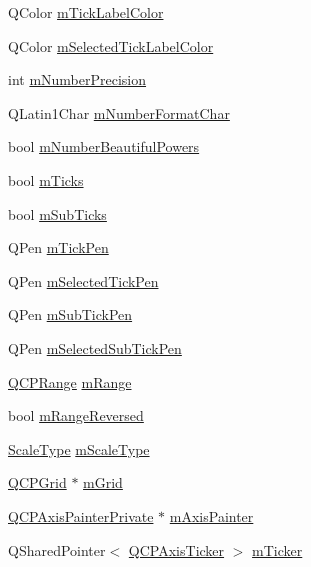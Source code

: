 \begin{DoxyCompactItemize}
\item 
Q\+Color \hyperlink{class_q_c_p_axis_a6384a749b3b56a97df081d8082321ab4}{m\+Tick\+Label\+Color}
\item 
Q\+Color \hyperlink{class_q_c_p_axis_a3bcad40902f45dc4c991a2c3e4d31d70}{m\+Selected\+Tick\+Label\+Color}
\item 
int \hyperlink{class_q_c_p_axis_acd76e8c783384d99ccc4a13797eec188}{m\+Number\+Precision}
\item 
Q\+Latin1\+Char \hyperlink{class_q_c_p_axis_a39594313deef458f425bba25cd337a8a}{m\+Number\+Format\+Char}
\item 
bool \hyperlink{class_q_c_p_axis_af03809bee3f3e35fcc38d25b6dd5003b}{m\+Number\+Beautiful\+Powers}
\item 
bool \hyperlink{class_q_c_p_axis_ab111e74bba22e06848897c932fc549fe}{m\+Ticks}
\item 
bool \hyperlink{class_q_c_p_axis_af16aab9c3effa482fa10e7dd5c3d91f3}{m\+Sub\+Ticks}
\item 
Q\+Pen \hyperlink{class_q_c_p_axis_a1d52c78c856d8bd1f331d4ec4e63d944}{m\+Tick\+Pen}
\item 
Q\+Pen \hyperlink{class_q_c_p_axis_a9524593dbc75a5c5b29dbd1cb4b37df5}{m\+Selected\+Tick\+Pen}
\item 
Q\+Pen \hyperlink{class_q_c_p_axis_a32ef56d3a417866720eb12667d27dbd1}{m\+Sub\+Tick\+Pen}
\item 
Q\+Pen \hyperlink{class_q_c_p_axis_aa5cc6afc5dc2a365f5abbd36eb04a1dc}{m\+Selected\+Sub\+Tick\+Pen}
\item 
\hyperlink{class_q_c_p_range}{Q\+C\+P\+Range} \hyperlink{class_q_c_p_axis_a1ee36773c49062d751560e11f90845f7}{m\+Range}
\item 
bool \hyperlink{class_q_c_p_axis_a5cb034f57aa3d773a9ca55a0931dbf7b}{m\+Range\+Reversed}
\item 
\hyperlink{class_q_c_p_axis_a36d8e8658dbaa179bf2aeb973db2d6f0}{Scale\+Type} \hyperlink{class_q_c_p_axis_ad706039549cbbbec5fcb2baf7894e04d}{m\+Scale\+Type}
\item 
\hyperlink{class_q_c_p_grid}{Q\+C\+P\+Grid} $\ast$ \hyperlink{class_q_c_p_axis_a17bffb94aaa40311f259c6ac7bcb5d5f}{m\+Grid}
\item 
\hyperlink{class_q_c_p_axis_painter_private}{Q\+C\+P\+Axis\+Painter\+Private} $\ast$ \hyperlink{class_q_c_p_axis_aeeae00935bd2dab82d64f32544a90913}{m\+Axis\+Painter}
\item 
Q\+Shared\+Pointer$<$ \hyperlink{class_q_c_p_axis_ticker}{Q\+C\+P\+Axis\+Ticker} $>$ \hyperlink{class_q_c_p_axis_ad9c3061cbd8bec5b0755d5a0bef3b700}{m\+Ticker}

\end{DoxyCompactItemize}
